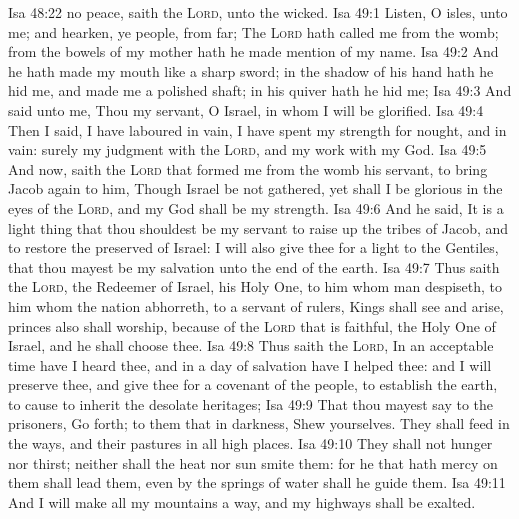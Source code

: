 \vs Isa 48:22  no peace, saith the \textsc{Lord}, unto the wicked.
\vs Isa 49:1 Listen, O isles, unto me; and hearken, ye people, from far; The \textsc{Lord} hath called me from the womb; from the bowels of my mother hath he made mention of my name.
\vs Isa 49:2 And he hath made my mouth like a sharp sword; in the shadow of his hand hath he hid me, and made me a polished shaft; in his quiver hath he hid me;
\vs Isa 49:3 And said unto me, Thou  my servant, O Israel, in whom I will be glorified.
\vs Isa 49:4 Then I said, I have laboured in vain, I have spent my strength for nought, and in vain:  surely my judgment  with the \textsc{Lord}, and my work with my God.
\vs Isa 49:5 And now, saith the \textsc{Lord} that formed me from the womb  his servant, to bring Jacob again to him, Though Israel be not gathered, yet shall I be glorious in the eyes of the \textsc{Lord}, and my God shall be my strength.
\vs Isa 49:6 And he said, It is a light thing that thou shouldest be my servant to raise up the tribes of Jacob, and to restore the preserved of Israel: I will also give thee for a light to the Gentiles, that thou mayest be my salvation unto the end of the earth.
\vs Isa 49:7 Thus saith the \textsc{Lord}, the Redeemer of Israel,  his Holy One, to him whom man despiseth, to him whom the nation abhorreth, to a servant of rulers, Kings shall see and arise, princes also shall worship, because of the \textsc{Lord} that is faithful,  the Holy One of Israel, and he shall choose thee.
\vs Isa 49:8 Thus saith the \textsc{Lord}, In an acceptable time have I heard thee, and in a day of salvation have I helped thee: and I will preserve thee, and give thee for a covenant of the people, to establish the earth, to cause to inherit the desolate heritages;
\vs Isa 49:9 That thou mayest say to the prisoners, Go forth; to them that  in darkness, Shew yourselves. They shall feed in the ways, and their pastures  in all high places.
\vs Isa 49:10 They shall not hunger nor thirst; neither shall the heat nor sun smite them: for he that hath mercy on them shall lead them, even by the springs of water shall he guide them.
\vs Isa 49:11 And I will make all my mountains a way, and my highways shall be exalted.
